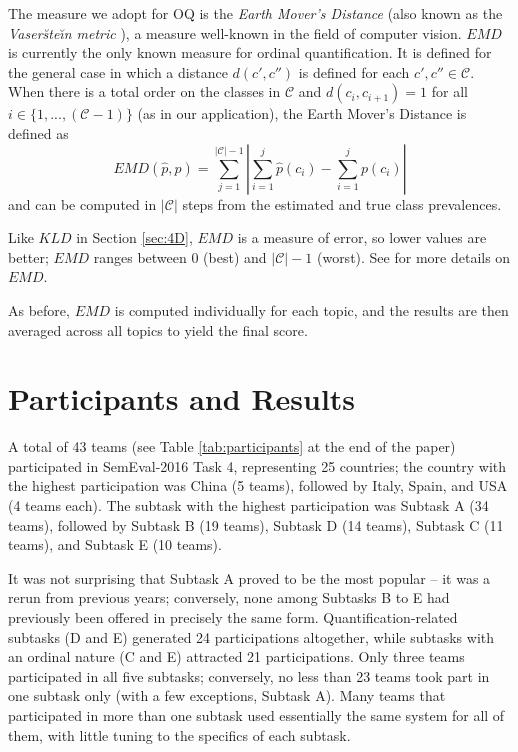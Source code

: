 \documentclass[11pt,letterpaper]{article}
\newif\ifdraft
\newcommand{\fabrizio}[1]{\ifdraft{\textcolor{cyan}{[Fabrizio]: {#1}}}\else{\vspace{0ex}}\fi}
\begin{document}
The measure we adopt for OQ is the \emph{Earth Mover's Distance}
\cite{Rubner:2000fk} (also known as the \emph{Vaser\u{s}te\u{\i}n
metric} \cite{Ruschendorf:2001mz}), a measure well-known in the field
of computer vision. $EMD$ is currently the only known measure for
ordinal quantification. It is defined for the general case in
which a distance $d(c',c'')$ is defined for each
$c',c''\in\mathcal{C}$. When there is a total order on the classes in
$\mathcal{C}$ and $d(c_i,c_{i+1})=1$ for all
$i\in\{1,...,(\mathcal{C}-1)\}$ (as in our
application), the Earth Mover's Distance is defined as
\begin{equation}
  \label{eq:EMD}
  EMD(\hat{p},p) = \sum_{j=1}^{|\mathcal{C}|-1}|\sum_{i=1}^{j}\hat{p}(c_{i})-\sum_{i=1}^{j}p(c_{i})|
\end{equation}
\noindent and can be computed in $|\mathcal{C}|$ steps from the
estimated and true class prevalences.

Like $KLD$ in Section \ref{sec:4D}, $EMD$ is a measure of error, so
lower values are better; $EMD$ ranges between 0 (best) and
$|\mathcal{C}|-1$ (worst). See \cite{Esuli:2010fk} for more details on
$EMD$.

As before, $EMD$ is computed individually for each topic, and the
results are then averaged across all topics to yield the final score.


\section{Participants and Results}
\label{sec:results}

\noindent A total of 43 teams (see Table \ref{tab:participants} at the
end of the paper) participated in SemEval-2016 Task 4, representing 25 countries;
the country with the highest participation was China (5 teams),
followed by Italy, Spain, and USA (4 teams each). The subtask with the
highest participation was Subtask A (34 teams), followed by Subtask B
(19 teams), Subtask D (14 teams), Subtask C (11 teams), and Subtask E
(10 teams).

It was not surprising that Subtask A proved to be the most popular --
it was a rerun from previous years; conversely, none among Subtasks B
to E had previously been offered in precisely the same
form. Quantification-related subtasks (D and E) generated 24
participations altogether, while subtasks with an ordinal nature (C
and E) attracted 21 participations. Only three teams participated in
all five subtasks; conversely, no less than 23 teams took part in one
subtask only (with a few exceptions, Subtask A).  Many teams that
participated in more than one subtask used essentially the same system
for all of them, with little tuning to the specifics of each subtask.
\end{document}
